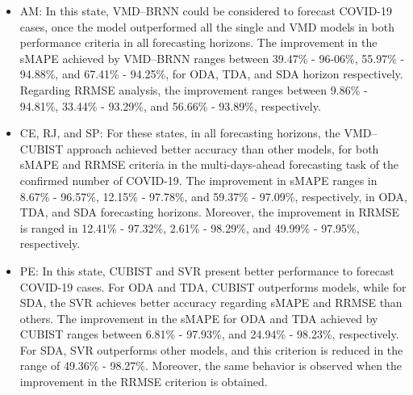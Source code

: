 \begin{itemize}
    \item \ac{AM}: In this state, \ac{VMD}--\ac{BRNN} could be considered to forecast \ac{COVID-19} cases, once the model outperformed all the single and \ac{VMD} models in both performance criteria in all forecasting horizons. The improvement in the \ac{sMAPE} achieved by \ac{VMD}--\ac{BRNN} ranges between 39.47\% - 96-06\%, 55.97\% - 94.88\%, and 67.41\% - 94.25\%, for \ac{ODA}, \ac{TDA}, and \ac{SDA} horizon respectively. Regarding \ac{RRMSE} analysis, the improvement ranges between 9.86\% - 94.81\%, 33.44\% - 93.29\%, and 56.66\% - 93.89\%, respectively.
    
    \item \ac{CE}, \ac{RJ}, and \ac{SP}: For these states, in all forecasting horizons, the \ac{VMD}--\ac{CUBIST} approach achieved better accuracy than other models, for both \ac{sMAPE} and \ac{RRMSE} criteria in the multi-days-ahead forecasting task of the confirmed number of \ac{COVID-19}. The improvement in \ac{sMAPE} ranges in 8.67\% - 96.57\%, 12.15\% - 97.78\%, and 59.37\% - 97.09\%, respectively, in \ac{ODA}, \ac{TDA}, and \ac{SDA} forecasting horizons. Moreover, the improvement in \ac{RRMSE} is ranged in 12.41\% - 97.32\%, 2.61\% - 98.29\%, and 49.99\% - 97.95\%, respectively.

    \item \ac{PE}: In this state, \ac{CUBIST} and \ac{SVR} present better performance to forecast \ac{COVID-19} cases. For \ac{ODA} and \ac{TDA}, \ac{CUBIST} outperforms models, while for \ac{SDA}, the \ac{SVR} achieves better accuracy regarding \ac{sMAPE} and \ac{RRMSE} than others. The improvement in the \ac{sMAPE} for \ac{ODA} and \ac{TDA} achieved by \ac{CUBIST} ranges between 6.81\% - 97.93\%, and 24.94\% - 98.23\%, respectively. For \ac{SDA}, \ac{SVR} outperforms other models, and this criterion is reduced in the range of 49.36\% - 98.27\%. Moreover, the same behavior is observed when the improvement in the \ac{RRMSE} criterion is obtained.
\end{itemize}

